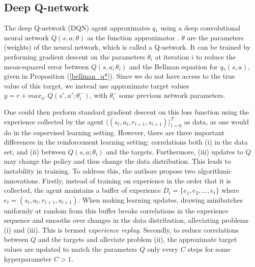 \documentclass[11pt, a4paper, bibliography=totoc]{report}
\begin{document}

\subsection{Deep Q-network} \label{DQN}
The deep Q-network (DQN) agent approximates $ q_* $ using a deep convolutional neural network $ Q(s,a; \theta) $ as the function approximator \cite{Mnih2015}. $ \theta $ are the parameters (weights) of the neural network, which is called a Q-network. It can be trained by performing gradient descent on the parameters $ \theta_i $ at iteration $ i $ to reduce the mean-squared error between $ Q(s,a; \theta_i) $ and the Bellman equation for $ q_*(s,a) $, given in Proposition (\ref{bellman_q*}). Since we do not have access to the true value of this target, we instead use approximate target values $ y = r + max_{a'} ~ Q(s', a' ; \theta_i^-) $, with $ \theta_i^- $ some previous network parameters.

One could then perform standard gradient descent on this loss function using the experience collected by the agent $\langle (s_t, a_t, r_{t+1}, s_{t+1}) \rangle_{t=0}^T $ as data, as one would do in the supervised learning setting. However, there are three important differences in the reinforcement learning setting: correlations both (i) in the data set, and (ii) between $ Q(s,a ; \theta_i) $ and the targets. Furthermore, (iii) updates to $ Q $ may change the policy and thus change the data distribution. This leads to instability in training. To address this, the authors propose two algorithmic innovations. Firstly, instead of training on experience in the order that it is collected, the agent maintains a buffer of experience $ D_t = \{ e_1, e_2, \dots, e_t \} $ where $ e_t = (s_t, a_t, r_{t+1}, s_{t+1}) $. When making learning updates, drawing minibatches uniformly at random from this buffer breaks correlations in the experience sequence and smooths over changes in the data distribution, alleviating problems (i) and (iii). This is termed \textit{experience replay}. Secondly, to reduce correlations between $ Q $ and the targets and alleviate problem (ii), the approximate target values are updated to match the parameters $ Q $ only every $ C $ steps for some hyperparameter $ C > 1 $.
\end{document}
